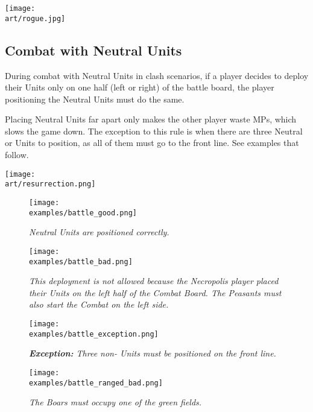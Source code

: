 \begin{multicols}{2}
\texttt{[image: \\art/rogue.jpg]}

\subsection*{Combat with Neutral Units}

During combat with Neutral Units in clash scenarios, if a player decides to deploy their Units only on one half (left or right) of the battle board, the player positioning the Neutral Units must do the same.

Placing Neutral Units far apart only makes the other player waste MPs, which slows the game down.
The exception to this rule is when there are three Neutral  or  Units to position, as all of them must go to the front line.
See examples that follow.

\begin{center}
  \texttt{[image: \\art/resurrection.png]}
\end{center}

\end{multicols}

\begin{figure*}[!h]
  \mbox{}
  \hfill
  \begin{minipage}[t]{0.44\textwidth}
    \centering
    \texttt{[image: \\examples/battle\_good.png]}
    \caption[good protected]{\textit{Neutral Units are positioned correctly.}}
  \end{minipage}
  \hfill
  \begin{minipage}[t]{0.44\textwidth}
    \centering
    \texttt{[image: \\examples/battle\_bad.png]}
    \caption[bad protected]{\textit{This deployment is not allowed because the Necropolis player placed their Units on the left half of the Combat Board.
      The Peasants must also start the Combat on the left side.}}
  \end{minipage}
  \hfill
  \mbox{}
\end{figure*}

\clearpage

\begin{figure*}[!h]
  \mbox{}
  \hfill
  \begin{minipage}[t]{0.44\textwidth}
    \centering
    \texttt{[image: \\examples/battle\_exception.png]}
    \caption[exception protected]{\textit{\textbf{Exception:} Three non- Units must be positioned on the front line.}}
  \end{minipage}
  \hfill
  \begin{minipage}[t]{0.44\textwidth}
    \centering
    \texttt{[image: \\examples/battle\_ranged\_bad.png]}
    \caption[ranged protected]{\textit{The Boars must occupy one of the green fields.}}
  \end{minipage}
  \hfill
  \mbox{}
\end{figure*}

